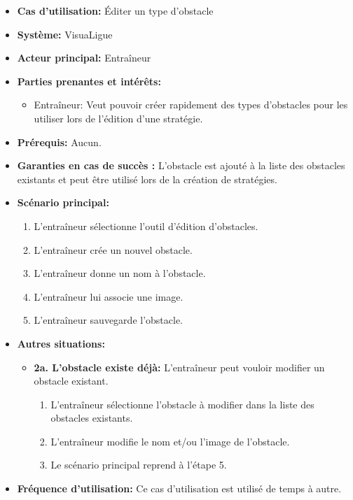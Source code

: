 \begin{itemize}
    \item \textbf{Cas d'utilisation:} \'Editer un type d'obstacle
    \item \textbf{Syst\`eme:} VisuaLigue
    \item \textbf{Acteur principal:} Entra\^ineur
    \item \textbf{Parties prenantes et int\'er\^ets:}
        \begin{itemize}
            \item Entra\^ineur: Veut pouvoir cr\'eer rapidement des types d'obstacles pour les utiliser lors de l'\'edition d'une strat\'egie.
        \end{itemize}
    \item \textbf{Pr\'erequis:} Aucun.
    \item \textbf{Garanties en cas de succ\`es :} L'obstacle est ajout\'e \`a la liste des obstacles existants et peut \^etre utilis\'e lors de la cr\'eation de strat\'egies.
    \item \textbf{Sc\'enario principal:}
        \begin{enumerate}
        	\item L'entraîneur sélectionne l'outil d'édition d'obstacles.
        	\item L'entraîneur crée un nouvel obstacle.
            \item L'entra\^ineur donne un nom \`a l'obstacle.
            \item L'entra\^ineur lui associe une image.
            \item L'entra\^ineur sauvegarde l'obstacle.
        \end{enumerate}
    \item \textbf{Autres situations:} 
    	\begin{itemize}
    		\item \textbf{2a. L'obstacle existe déjà: } L'entraîneur peut vouloir modifier un obstacle existant.
    		\begin{enumerate}
    			\item L'entraîneur sélectionne l'obstacle à modifier dans la liste des obstacles existants.
    			\item L'entraîneur modifie le nom et/ou l'image de l'obstacle.
    			\item Le scénario principal reprend à l'étape 5.
    		\end{enumerate}
    	\end{itemize}
    \item \textbf{Fréquence d'utilisation:} Ce cas d'utilisation est utilis\'e de temps \`a autre.
\end{itemize}



